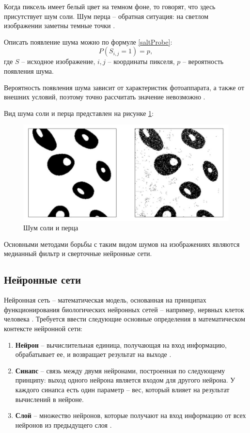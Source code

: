 Когда пиксель имеет белый цвет на темном фоне, то говорят, что здесь присутствует шум соли.
Шум перца -- обратная ситуация: на светлом изображении заметны темные точки \cite{moments}.

Описать появление шума можно по формуле \ref{saltProbe}: 
\begin{equation}
	\label{saltProbe}
	P(S_{i, j} = 1) = p,
\end{equation}
где $S$ -- исходное изображение, $i, j$ -- координаты пикселя, $p$ -- вероятность появления шума. 

Вероятность появления шума зависит от характеристик фотоаппарата, а также от внешних условий, поэтому точно рассчитать значение невозможно \cite{moments}.

\newpage
Вид шума соли и перца представлен на рисунке \ref{fig::salt}:
\FloatBarrier
\begin{figure}[h]	
	\begin{center}
		\includegraphics[width=\linewidth]{inc/png/salt.png}
	\end{center}
	\captionsetup{justification=centering}
	\caption{Шум соли и перца}
	\label{fig::salt}
\end{figure}
\FloatBarrier

Основными методами борьбы с таким видом шумов на изображениях являются медианный фильтр и сверточные нейронные сети.

\subsection{Нейронные сети}
Нейронная сеть -- математическая модель, основанная на принципах функционирования биологических нейронных сетей -- например, нервных клеток человека \cite{neural}.
Требуется ввести следующие основные определения в математическом контексте нейронной сети:
\begin{enumerate}
	\item \textbf{Нейрон} -- вычислительная единица, получающая на вход информацию, обрабатывает ее, и возвращает результат на выходе \cite{neural}.
	\item \textbf{Синапс} -- связь между двумя нейронами, построенная по следующему принципу: выход одного нейрона является входом для другого нейрона. 
	У каждого синапса есть один параметр -- вес, который влияет на результат вычислений в нейроне.
	\item \textbf{Слой} -- множество нейронов, которые получают на вход информацию от всех нейронов из предыдущего слоя \cite{neural}.
\end{enumerate}

